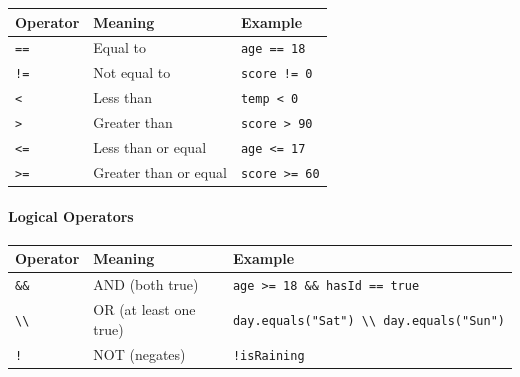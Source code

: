 \documentclass[
  justified,
  openright,
]{tufte-book}
\let\subsubsection\paragraph
\let\paragraph\paragraph
\let\subsubsection\paragraph
\let\paragraph\paragraph
\begin{document}
{\def\LTcaptype{none} %
\begin{longtable}[]{@{}lll@{}}
\toprule\noalign{}
Operator & Meaning & Example \\
\midrule\noalign{}
\endhead
\bottomrule\noalign{}
\endlastfoot
\texttt{==} & Equal to & \texttt{age\ ==\ 18} \\
\texttt{!=} & Not equal to & \texttt{score\ !=\ 0} \\
\texttt{\textless{}} & Less than & \texttt{temp\ \textless{}\ 0} \\
\texttt{\textgreater{}} & Greater than &
\texttt{score\ \textgreater{}\ 90} \\
\texttt{\textless{}=} & Less than or equal &
\texttt{age\ \textless{}=\ 17} \\
\texttt{\textgreater{}=} & Greater than or equal &
\texttt{score\ \textgreater{}=\ 60} \\
\end{longtable}
}

\subsubsection{Logical Operators}\label{logical-operators}

{\def\LTcaptype{none} %
\begin{longtable}[]{@{}
  >{\raggedright\arraybackslash}p{}
  >{\raggedright\arraybackslash}p{}
  >{\raggedright\arraybackslash}p{}@{}}
\toprule\noalign{}
\begin{minipage}[b]{\linewidth}\raggedright
Operator
\end{minipage} & \begin{minipage}[b]{\linewidth}\raggedright
Meaning
\end{minipage} & \begin{minipage}[b]{\linewidth}\raggedright
Example
\end{minipage} \\
\midrule\noalign{}
\endhead
\bottomrule\noalign{}
\endlastfoot
\texttt{\&\&} & AND (both true) &
\texttt{age\ \textgreater{}=\ 18\ \&\&\ hasId\ ==\ true} \\
\texttt{\textbackslash{}\textbar{}\textbackslash{}\textbar{}} & OR (at
least one true) &
\texttt{day.equals("Sat")\ \textbackslash{}\textbar{}\textbackslash{}\textbar{}\ day.equals("Sun")} \\
\texttt{!} & NOT (negates) & \texttt{!isRaining} \\
\end{longtable}
}
\end{document}
